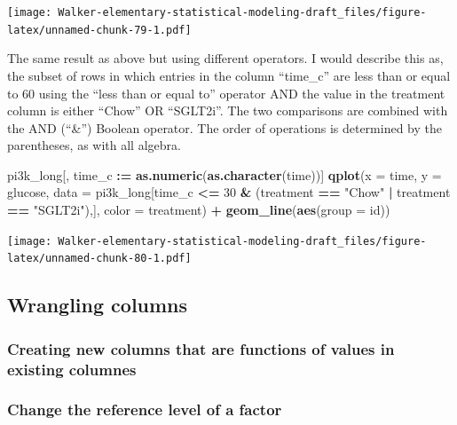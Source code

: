 \documentclass[]{book}
\newenvironment{Shaded}{\begin{snugshade}}{\end{snugshade}}
\newcommand{\DataTypeTok}[1]{\textcolor[rgb]{0.13,0.29,0.53}{#1}}
\newcommand{\DecValTok}[1]{\textcolor[rgb]{0.00,0.00,0.81}{#1}}
\newcommand{\ErrorTok}[1]{\textcolor[rgb]{0.64,0.00,0.00}{\textbf{#1}}}
\newcommand{\KeywordTok}[1]{\textcolor[rgb]{0.13,0.29,0.53}{\textbf{#1}}}
\newcommand{\NormalTok}[1]{#1}
\newcommand{\OperatorTok}[1]{\textcolor[rgb]{0.81,0.36,0.00}{\textbf{#1}}}
\newcommand{\StringTok}[1]{\textcolor[rgb]{0.31,0.60,0.02}{#1}}
\begin{document}
\texttt{[image: Walker-elementary-statistical-modeling-draft\_files/figure-latex/unnamed-chunk-79-1.pdf]}

The same result as above but using different operators. I would describe this as, the subset of rows in which entries in the column ``time\_c'' are less than or equal to 60 using the ``less than or equal to'' operator AND the value in the treatment column is either ``Chow'' OR ``SGLT2i''. The two comparisons are combined with the AND (``\&'') Boolean operator. The order of operations is determined by the parentheses, as with all algebra.

\begin{Shaded}
\begin{Highlighting}[]
\NormalTok{pi3k_long[, time_c }\OperatorTok{:}\ErrorTok{=}\StringTok{ }\KeywordTok{as.numeric}\NormalTok{(}\KeywordTok{as.character}\NormalTok{(time))]}
\KeywordTok{qplot}\NormalTok{(}\DataTypeTok{x =}\NormalTok{ time,}
      \DataTypeTok{y =}\NormalTok{ glucose,}
      \DataTypeTok{data =}\NormalTok{ pi3k_long[time_c }\OperatorTok{<=}\StringTok{ }\DecValTok{30} \OperatorTok{&}\StringTok{ }\NormalTok{(treatment }\OperatorTok{==}\StringTok{ "Chow"} \OperatorTok{|}\StringTok{ }\NormalTok{treatment }\OperatorTok{==}\StringTok{ "SGLT2i"}\NormalTok{),],}
      \DataTypeTok{color =}\NormalTok{ treatment) }\OperatorTok{+}
\StringTok{  }\KeywordTok{geom_line}\NormalTok{(}\KeywordTok{aes}\NormalTok{(}\DataTypeTok{group =}\NormalTok{ id))}
\end{Highlighting}
\end{Shaded}

\texttt{[image: Walker-elementary-statistical-modeling-draft\_files/figure-latex/unnamed-chunk-80-1.pdf]}

\hypertarget{wrangling-columns}{%
\subsection{Wrangling columns}\label{wrangling-columns}}

\hypertarget{creating-new-columns-that-are-functions-of-values-in-existing-columnes}{%
\subsubsection{Creating new columns that are functions of values in existing columnes}\label{creating-new-columns-that-are-functions-of-values-in-existing-columnes}}

\hypertarget{change-the-reference-level-of-a-factor}{%
\subsubsection{Change the reference level of a factor}\label{change-the-reference-level-of-a-factor}}
\end{document}
